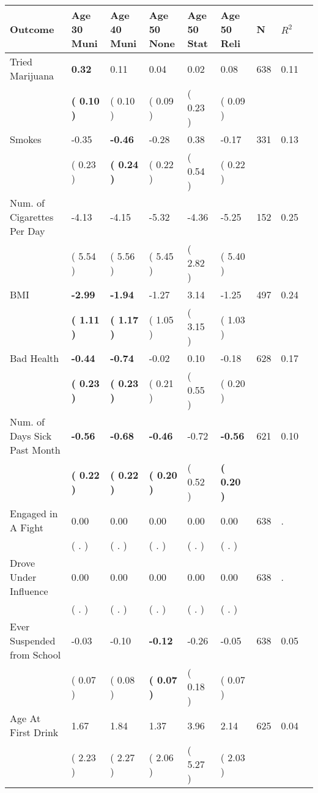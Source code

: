 \begin{tabular}{L{6.2cm} C{1.8cm} C{1.8cm} C{1.8cm} C{1.8cm} C{1.8cm} C{1.8cm} C{0.3cm} C{0.3cm}}
\toprule
 \textbf{Outcome} & \textbf{Age 30 Muni} & \textbf{Age 40 Muni} & \textbf{Age 50 None} & \textbf{Age 50 Stat} & \textbf{Age 50 Reli} & \textbf{N} & \textbf{$ R^2$} \\
\midrule
Tried Marijuana & \textbf{     0.32} &      0.11 &      0.04 &      0.02 &      0.08  & 638 &       0.11 \\ 
 & \textbf{(     0.10 )} & (     0.10 ) & (     0.09 ) & (     0.23 ) & (     0.09 )  & \\
Smokes &     -0.35 & \textbf{    -0.46} &     -0.28 &      0.38 &     -0.17  & 331 &       0.13 \\ 
 & (     0.23 ) & \textbf{(     0.24 )} & (     0.22 ) & (     0.54 ) & (     0.22 )  & \\
Num. of Cigarettes Per Day &     -4.13 &     -4.15 &     -5.32 &     -4.36 &     -5.25  & 152 &       0.25 \\ 
 & (     5.54 ) & (     5.56 ) & (     5.45 ) & (     2.82 ) & (     5.40 )  & \\
BMI & \textbf{    -2.99} & \textbf{    -1.94} &     -1.27 &      3.14 &     -1.25  & 497 &       0.24 \\ 
 & \textbf{(     1.11 )} & \textbf{(     1.17 )} & (     1.05 ) & (     3.15 ) & (     1.03 )  & \\
Bad Health & \textbf{    -0.44} & \textbf{    -0.74} &     -0.02 &      0.10 &     -0.18  & 628 &       0.17 \\ 
 & \textbf{(     0.23 )} & \textbf{(     0.23 )} & (     0.21 ) & (     0.55 ) & (     0.20 )  & \\
Num. of Days Sick Past Month & \textbf{    -0.56} & \textbf{    -0.68} & \textbf{    -0.46} &     -0.72 & \textbf{    -0.56}  & 621 &       0.10 \\ 
 & \textbf{(     0.22 )} & \textbf{(     0.22 )} & \textbf{(     0.20 )} & (     0.52 ) & \textbf{(     0.20 )}  & \\
Engaged in A Fight &      0.00 &      0.00 &      0.00 &      0.00 &      0.00  & 638 &          . \\ 
 & (        . ) & (        . ) & (        . ) & (        . ) & (        . )  & \\
Drove Under Influence &      0.00 &      0.00 &      0.00 &      0.00 &      0.00  & 638 &          . \\ 
 & (        . ) & (        . ) & (        . ) & (        . ) & (        . )  & \\
Ever Suspended from School &     -0.03 &     -0.10 & \textbf{    -0.12} &     -0.26 &     -0.05  & 638 &       0.05 \\ 
 & (     0.07 ) & (     0.08 ) & \textbf{(     0.07 )} & (     0.18 ) & (     0.07 )  & \\
Age At First Drink &      1.67 &      1.84 &      1.37 &      3.96 &      2.14  & 625 &       0.04 \\ 
 & (     2.23 ) & (     2.27 ) & (     2.06 ) & (     5.27 ) & (     2.03 )  & \\
\bottomrule
\end{tabular}
